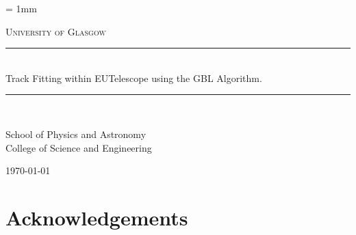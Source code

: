 \documentclass[12pt,a4paper]{report}
\newif\
\newcommand{\twolinesahead}[5][]{
  \def\dist{6};
  \newdimen\ym;
  \newdimen\xm;
  \newdimen\yf;
  \newdimen\xf;
  \ExtractCoordinate{$(#3)$}{\xm}{\ym};
  \ExtractCoordinate{$(#2)$}{\xf}{\yf};
  \ifdim \ym < \yf
  \def\fac{1};
  \else
  \def\fac{-1};
  \fi
  \path [pline] ([yshift=-\dist * \fac]#2.east) -- (#3.west);
  \coordinate (m) at ($(#2)!0.5!(#3)$);
  \coordinate (mp) at ($(m)+(0,1em*\fac)$);
  \node (nm) at (mp) {#5};
  \foreach \x in {\fac,0}
  {
    \ifnum \x = 0
    \path [pline, decoration={markings, mark=at position 0.5 with {\arrow{triangle 60}}}, postaction={decorate}] ([yshift=\dist * \x]#2.east) -- ([yshift=\dist * \x]#4.west);
    \else
    \path [pline] ([yshift=\dist * \x]#2.east) -- ([yshift=\dist * \x]#4.west);
    \fi
  };
}
\newcommand{\HRule}{\rule{\linewidth}{0.5mm}}
\begin{document}
\unitlength = 1mm

\onehalfspace

\begin{titlepage}
\begin{center}

\textsc{\LARGE University of Glasgow}\\[0.8cm]


\HRule\\[0.6cm]
{ \Huge Track Fitting within EUTelescope using the GBL Algorithm. }\\[0.6cm]
\HRule\\[0.7cm]

{
\Large


School of Physics and Astronomy\\
College of Science and Engineering\\[1.5cm]

}

\vfill

{\large \mydate\today}

\end{center}
\end{titlepage}



\chapter*{Acknowledgements}

\clearpage

\begin{abstract}

\end{abstract}
\clearpage


\tableofcontents
\clearpage


\pagestyle{fancy}

    \fancyhf{}%
    \fancyhead[LE,RO]{\thepage}
    \fancyhead[RE]{\textit{\nouppercase{\rightmark}} }
    \fancyhead[LO]{\textit{\nouppercase{\rightmark}} }
    \renewcommand{\headrulewidth}{0pt} %
    \renewcommand{\footrulewidth}{0pt}

\renewcommand{\chaptermark}[1]{ \markright{\thechapter \hspace{0.2cm} #1}{} }
\renewcommand{\sectionmark}[1]{ \markright{\thesection \hspace{0.2cm} #1}{} }
\end{document}
